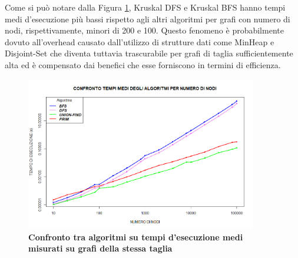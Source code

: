 \documentclass[]{article}
\begin{document}
\begin{flushleft}
Come si può notare dalla Figura \ref{conf_tot}, Kruskal DFS e Kruskal BFS hanno tempi medi d'esecuzione più bassi rispetto agli altri algoritmi per grafi con numero di nodi, rispettivamente, minori di 200 e 100. Questo fenomeno è probabilmente dovuto all'overhead causato dall'utilizzo di strutture dati come MinHeap e Disjoint-Set che diventa tuttavia trascurabile per grafi di taglia sufficientemente alta ed è compensato dai benefici che esse forniscono in termini di efficienza.
\begin{figure}[h]
	\centering
	\includegraphics[width=0.9\textwidth,height=\textheight,keepaspectratio]{CONFRONTO_TOTALE.png}
	\caption{\textbf{Confronto tra algoritmi su tempi d'esecuzione medi misurati su grafi della stessa taglia}}
	\label{conf_tot}
\end{figure}









\end{flushleft}
\end{document}
